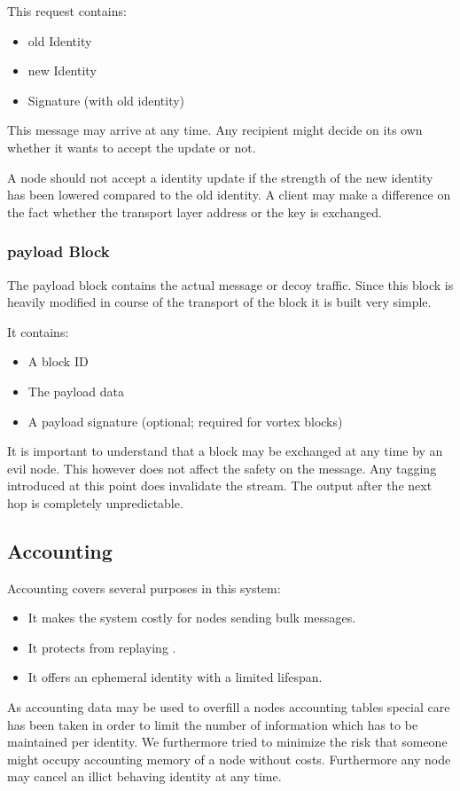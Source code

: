 This request contains:
\begin{itemize}
	\item old Identity
	\item new Identity
	\item Signature (with old identity)
\end{itemize}

This message may arrive at any time. Any recipient might decide on its own whether it wants to accept the update or not.

A node should not accept a identity update if the strength of the new identity has been lowered compared to the old identity. A client may make a difference on the fact whether the transport layer address or the key is exchanged. 

\subsubsection{payload Block}
The payload block contains the actual message or decoy traffic. Since this block is heavily modified in course of the transport of the block it is built very simple.

It contains:
\begin{itemize}
	\item A block ID
	\item The payload data
	\item A payload signature (optional; required for vortex blocks)
\end{itemize}

It is important to understand that a block may be exchanged at any time by an evil node. This however does not affect the safety on the message. Any tagging introduced at this point does invalidate the stream. The output after the next hop is completely unpredictable.

\subsection{Accounting\label{sec:accounting}}
Accounting covers several purposes in this system:
\begin{itemize}
	\item It makes the system costly for nodes sending bulk messages.
	\item It protects from replaying .
	\item It offers an ephemeral identity with a limited lifespan.
\end{itemize}

As accounting data may be used to overfill a nodes accounting tables special care has been taken in order to limit the number of information which has to be maintained per identity. We furthermore tried to minimize the risk that someone might occupy accounting memory of a node without costs. Furthermore any node may cancel an illict behaving identity at any time.

